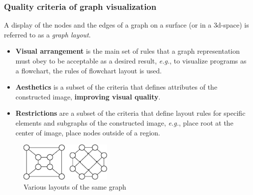 \documentclass[aspectratio=169]{beamer}
\begin{document}
\begin{frame}
\frametitle{Quality criteria of graph visualization}

A display of the nodes and the edges of a graph on a surface (or in a 3d-space) is referred to as a \emph{graph layout}.

	\begin{itemize}
\item \textbf{Visual arrangement} is the main set of rules that a graph representation must obey to be acceptable as a desired result, \textit{e.g.}, to visualize programs as a flowchart, the rules of flowchart layout is used.
\item \textbf{Aesthetics} is a subset of the criteria that defines attributes of the constructed image, \textbf{improving visual quality}.
\item \textbf{Restrictions} are a subset of the criteria that define layout rules for specific elements and subgraphs of the constructed image, \textit{e.g.}, place root at the center of image, place nodes outside of a region.
\end{itemize}
	\begin{figure}[htbp]
		\centering
			\includegraphics[width=0.40\textwidth]{Pic/Pic1.eps}
                \caption{Various layouts of the same graph}
		\label{fig:VisExample}
	\end{figure}
\end{frame}

\end{document}
